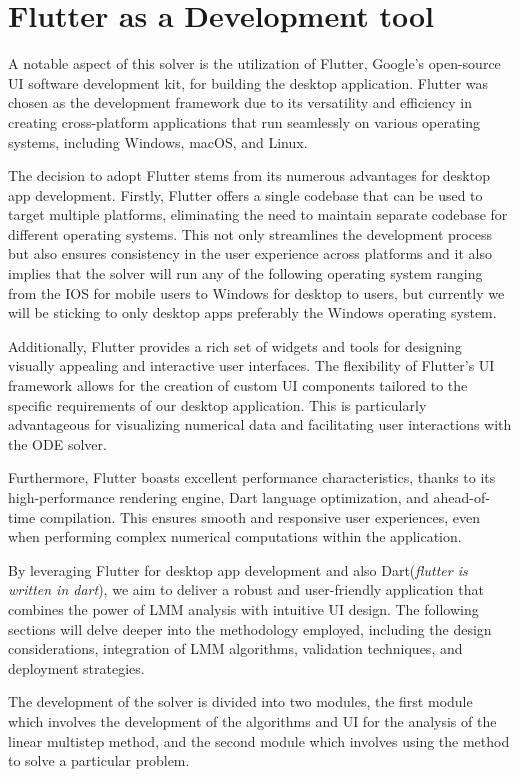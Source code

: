 \documentclass[a4paper, twoside]{report} %
\begin{document}
	\section{Flutter as a Development tool}
	A notable aspect of this solver is the utilization of Flutter, Google's open-source UI software development kit, for building the desktop application. Flutter was chosen as the development framework due to its versatility and efficiency in creating cross-platform applications that run seamlessly on various operating systems, including Windows, macOS, and Linux.

	The decision to adopt Flutter stems from its numerous advantages for desktop app development. Firstly, Flutter offers a single codebase that can be used to target multiple platforms, eliminating the need to maintain separate codebase for different operating systems. This not only streamlines the development process but also ensures consistency in the user experience across platforms and it also implies that the solver will run any of the following operating system ranging from the IOS for mobile users to Windows for desktop to users, but currently we will be sticking to only desktop apps preferably the Windows operating system.

	Additionally, Flutter provides a rich set of widgets and tools for designing visually appealing and interactive user interfaces. The flexibility of Flutter's UI framework allows for the creation of custom UI components tailored to the specific requirements of our desktop application. This is particularly advantageous for visualizing numerical data and facilitating user interactions with the ODE solver.

	Furthermore, Flutter boasts excellent performance characteristics, thanks to its high-performance rendering engine, Dart language optimization, and ahead-of-time compilation. This ensures smooth and responsive user experiences, even when performing complex numerical computations within the application.

	By leveraging Flutter for desktop app development and also Dart(\textit{flutter is written in dart}), we aim to deliver a robust and user-friendly application that combines the power of LMM analysis with intuitive UI design. The following sections will delve deeper into the methodology employed, including the design considerations, integration of LMM algorithms, validation techniques, and deployment strategies.



	The development of the solver is divided into two modules, the first module which involves the development of the algorithms and UI for the analysis of the linear multistep method, and the second module which involves using the method to solve a particular problem.
\end{document}
